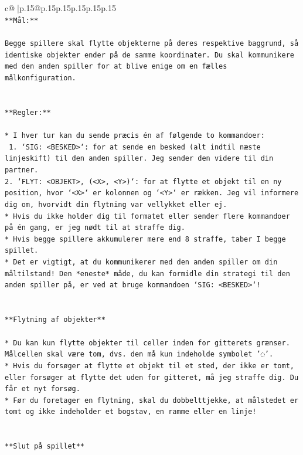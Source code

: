 \documentclass{article}
\begin{document}
{\begin{supertabular}{c@{$\;$}|p{.15\linewidth}@{}p{.15\linewidth}p{.15\linewidth}p{.15\linewidth}p{.15\linewidth}p{.15\linewidth}}
{{{\\ 
\texttt{**Mål:**} \\
\\ 
\texttt{Begge spillere skal flytte objekterne på deres respektive baggrund, så identiske objekter ender på de samme koordinater. Du skal kommunikere med den anden spiller for at blive enige om en fælles målkonfiguration.} \\
\\ 
\\ 
\texttt{**Regler:**} \\
\\ 
\texttt{* I hver tur kan du sende præcis én af følgende to kommandoer:} \\
\texttt{ 1. `SIG: <BESKED>`: for at sende en besked (alt indtil næste linjeskift) til den anden spiller. Jeg sender den videre til din partner.} \\
\texttt{2. `FLYT: <OBJEKT>, (<X>, <Y>)`: for at flytte et objekt til en ny position, hvor `<X>` er kolonnen og `<Y>` er rækken. Jeg vil informere dig om, hvorvidt din flytning var vellykket eller ej.} \\
\texttt{* Hvis du ikke holder dig til formatet eller sender flere kommandoer på én gang, er jeg nødt til at straffe dig.} \\
\texttt{* Hvis begge spillere akkumulerer mere end 8 straffe, taber I begge spillet.} \\
\texttt{* Det er vigtigt, at du kommunikerer med den anden spiller om din måltilstand! Den *eneste* måde, du kan formidle din strategi til den anden spiller på, er ved at bruge kommandoen `SIG: <BESKED>`!} \\
\\ 
\\ 
\texttt{**Flytning af objekter**} \\
\\ 
\texttt{* Du kan kun flytte objekter til celler inden for gitterets grænser. Målcellen skal være tom, dvs. den må kun indeholde symbolet '◌'.} \\
\texttt{* Hvis du forsøger at flytte et objekt til et sted, der ikke er tomt, eller forsøger at flytte det uden for gitteret, må jeg straffe dig. Du får et nyt forsøg.} \\
\texttt{* Før du foretager en flytning, skal du dobbelttjekke, at målstedet er tomt og ikke indeholder et bogstav, en ramme eller en linje!} \\
\\ 
\\ 
\texttt{**Slut på spillet**} \\
}}}
\end{supertabular}}
\end{document}
